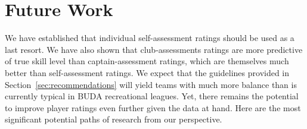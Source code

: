 \section{Future Work}\label{sec:summary}

We have established that individual self-assessment ratings should be used as a last resort. We have also shown that club-assessments ratings are more predictive of true skill level than captain-assessment ratings, which are themselves much better than self-assessment ratings. We expect that the guidelines provided in Section~\ref{sec:recommendations} will yield teams with much more balance than is currently typical in BUDA recreational leagues. Yet, there remains the potential to improve player ratings even further given the data at hand. Here are the most significant potential paths of research from our perspective.

